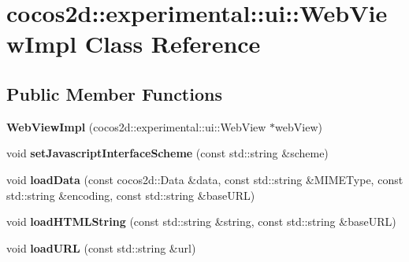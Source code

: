 \hypertarget{classcocos2d_1_1experimental_1_1ui_1_1WebViewImpl}{}\section{cocos2d\+:\+:experimental\+:\+:ui\+:\+:Web\+View\+Impl Class Reference}
\label{classcocos2d_1_1experimental_1_1ui_1_1WebViewImpl}
\subsection*{Public Member Functions}
\begin{DoxyCompactItemize}
\item 
\mbox{\label{classcocos2d_1_1experimental_1_1ui_1_1WebViewImpl_a5318c2957d9792a0c96f1fcced986abe}} 
{\bfseries Web\+View\+Impl} (cocos2d\+::experimental\+::ui\+::\+Web\+View $\ast$web\+View)
\item 
\mbox{\label{classcocos2d_1_1experimental_1_1ui_1_1WebViewImpl_ae33ed14f18d48fa5ef67c11388b8775e}} 
void {\bfseries set\+Javascript\+Interface\+Scheme} (const std\+::string \&scheme)
\item 
\mbox{\label{classcocos2d_1_1experimental_1_1ui_1_1WebViewImpl_a1e79d5cc0fa76604e9179aebe5ae34ce}} 
void {\bfseries load\+Data} (const cocos2d\+::\+Data \&data, const std\+::string \&M\+I\+M\+E\+Type, const std\+::string \&encoding, const std\+::string \&base\+U\+RL)
\item 
\mbox{\label{classcocos2d_1_1experimental_1_1ui_1_1WebViewImpl_a5e5fc6a9e7b11bb389db088fcdc6ee97}} 
void {\bfseries load\+H\+T\+M\+L\+String} (const std\+::string \&string, const std\+::string \&base\+U\+RL)
\item 
\mbox{\label{classcocos2d_1_1experimental_1_1ui_1_1WebViewImpl_a3da06400fe3739238562f9b73f6b8b1e}} 
void {\bfseries load\+U\+RL} (const std\+::string \&url)
\item 
\mbox{\label{classcocos2d_1_1experimental_1_1ui_1_1WebViewImpl_af5e32437723d794eade6c3b8460a051e}} 

\end{DoxyCompactItemize}
